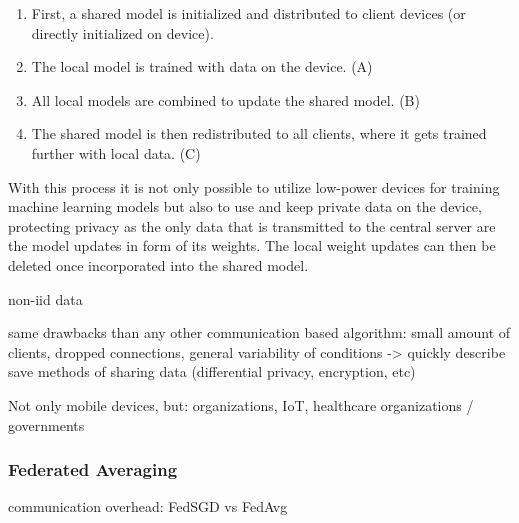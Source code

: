 \begin{enumerate}
    \item First, a shared model is initialized and distributed to client devices (or directly initialized on device).
    \item The local model is trained with data on the device. (A)
    \item All local models are combined to update the shared model. (B) 
    \item The shared model is then redistributed to all clients, where it gets trained further with local data. (C)
\end{enumerate}

With this process it is not only possible to utilize low-power devices for training machine learning models but also to use and keep private data on the device, protecting privacy as the only data that is transmitted to the central server are the model updates in form of its weights. The local weight updates can then be deleted once incorporated into the shared model.

non-iid data

same drawbacks than any other communication based algorithm: small amount of clients, dropped connections, general variability of conditions 
-> quickly describe save methods of sharing data (differential privacy, encryption, etc)

Not only mobile devices, but: organizations, IoT, healthcare organizations / governments

\subsubsection{Federated Averaging}
communication overhead:
FedSGD vs FedAvg


